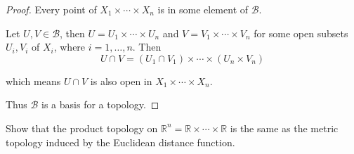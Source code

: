\begin{proof}
    Every point of $X_{1}\times\cdots\times X_{n}$ is in some element of $\mathscr{B}$.

    Let $U, V\in \mathscr{B}$, then $U = U_{1}\times\cdots\times U_{n}$ and $V = V_{1}\times\cdots\times V_{n}$ for some open subsets $U_{i}, V_{i}$ of $X_{i}$, where $i = 1,\ldots,n$. Then
    \[
        U\cap V = (U_{1}\cap V_{1})\times\cdots\times (U_{n}\times V_{n})
    \]

    which means $U\cap V$ is also open in $X_{1}\times\cdots\times X_{n}$.

    Thus $\mathscr{B}$ is a basis for a topology.
\end{proof}

\begin{exercise}{3.26}
    Show that the product topology on $\mathbb{R}^{n} = \mathbb{R}\times\cdots\times\mathbb{R}$ is the same as the metric topology induced by the Euclidean distance function.
\end{exercise}

